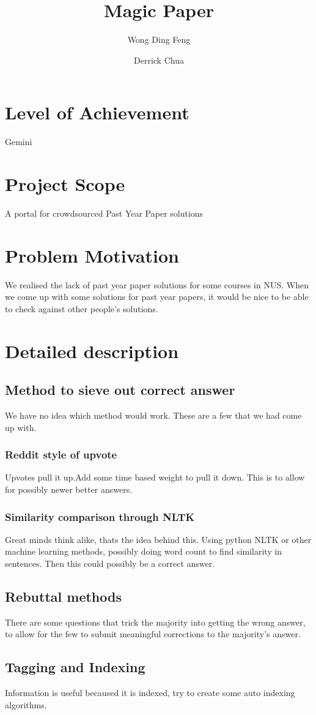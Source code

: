 \documentclass[12pt,a4paper]{article}
\author{Wong Ding Feng \and Derrick Chua}
\title{Magic Paper}
\begin{document}
\maketitle
\section{Level of Achievement}
Gemini
\section{Project Scope}
A portal for crowdsourced Past Year Paper solutions
\section{Problem Motivation}
We realised the lack of past year paper solutions for some courses in NUS\@. When we come up with some solutions for past year papers, it would be nice to be able to check against other people's solutions.
\section{Detailed description}
\subsection{Method to sieve out correct answer}
We have no idea which method would work. These are a few that we had come up with.
\subsubsection{Reddit style of upvote}
Upvotes pull it up.Add some time based weight to pull it down. This is to allow for possibly newer better answers.
\subsubsection{Similarity comparison through NLTK}
Great minds think alike, thats the idea behind this.
Using python NLTK or other machine learning methods, possibly doing word count to find similarity in sentences. Then this could possibly be a correct answer.
\subsection{Rebuttal methods}
There are some questions that trick the majority into getting the wrong answer, to allow for the few to submit meaningful corrections to the majority's answer. 
\subsection{Tagging and Indexing}
Information is useful becaused it is indexed, try to create some auto indexing algorithms.
\end{document}
